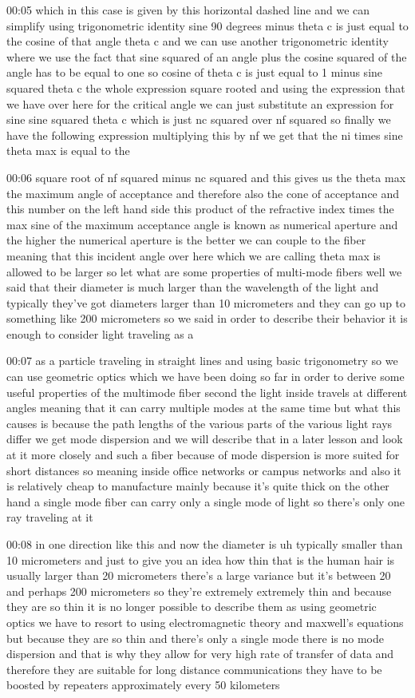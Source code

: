 00:05
which in this case is given by this horizontal dashed line
and we can simplify using trigonometric identity sine
90 degrees minus theta c is just equal to the cosine of that angle
theta c and we can use another trigonometric identity where we use the fact that
sine squared of an angle plus the cosine squared of the angle
has to be equal to one so cosine of theta c is just equal to
1 minus sine squared theta c the whole expression square rooted and using
the expression that we have over here for the critical angle
we can just substitute an expression for sine
sine squared theta c which is just nc squared over nf squared so
finally we have the following expression multiplying
this by nf we get that the ni times sine theta max is equal to the

00:06
square root of nf squared minus nc squared and this gives us the theta max the
maximum angle of acceptance and therefore also the cone of acceptance
and this number on the left hand side this product of the refractive index
times the max sine of the maximum acceptance angle is known as
numerical aperture and the higher the numerical aperture is
the better we can couple to the fiber meaning that this
incident angle over here which we are calling theta max is allowed to be larger
so let what are some properties of multi-mode fibers
well we said that their diameter is much larger
than the wavelength of the light and typically they've got
diameters larger than 10 micrometers and they can go up to something like 200
micrometers so we said in order to describe their
behavior it is enough to consider light traveling as a

00:07
as a particle traveling in straight lines and using basic trigonometry
so we can use geometric optics which we have been doing so far
in order to derive some useful properties of the multimode fiber
second the light inside travels at different angles meaning that it can
carry multiple modes at the same time but what this causes is because the path
lengths of the various parts of the various light rays
differ we get mode dispersion and we will describe that in a later lesson and
look at it more closely and such a fiber because of mode dispersion is
more suited for short distances so meaning inside office networks or
campus networks and also it is relatively cheap to manufacture
mainly because it's quite thick on the other hand a single mode fiber
can carry only a single mode of light so there's only one ray traveling at it

00:08
in one direction like this and now the diameter is uh typically smaller
than 10 micrometers and just to give you an idea how thin that is
the human hair is usually larger than 20
micrometers there's a large variance but it's between
20 and perhaps 200 micrometers so they're extremely extremely thin
and because they are so thin it is no longer possible to describe them as using
geometric optics we have to resort to using electromagnetic
theory and maxwell's equations but because they are so thin and there's
only a single mode there is no mode dispersion
and that is why they allow for very high rate of transfer of data and therefore
they are suitable for long distance communications
they have to be boosted by repeaters approximately every 50 kilometers

